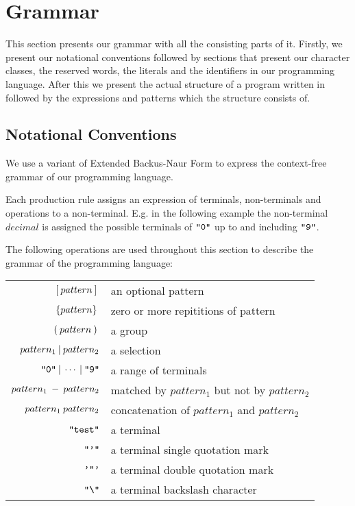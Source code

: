 \section{Grammar}
\label{sec:grammar}

This section presents our grammar with all the consisting parts of it. Firstly, we present our notational conventions followed by sections that present our character classes, the reserved words, the literals and the identifiers in our programming language. After this we present the actual structure of a program written in \productname{} followed by the expressions and patterns which the structure consists of.


\subsection{Notational Conventions}
We use a variant of Extended Backus-Naur Form to express the context-free grammar of
our programming language.

Each production rule assigns an expression of terminals, non-terminals and operations
to a non-terminal. E.g. in the following example the non-terminal $decimal$ is assigned
the possible terminals of $\texttt{"0"}$ up to and including $\texttt{"9"}$.

\begin{ebnf}
\end{ebnf}

The following operations are used throughout this section to describe the grammar of the programming language:

\begin{center}
\begin{tabular}{r l}
  $[\: pattern \:] \:$ & an optional pattern \\
  $\{pattern\} \:$ & zero or more repititions of pattern \\
  $(\: pattern \:) \:$ & a group \\
  $pattern_1 \: | \: pattern_2$ & a selection \\
  $\texttt{"0"} \: | \: \cdots \: | \: \texttt{"9"}$ & a range of terminals \\
  $pattern_1 \: - \: pattern_2$ & matched by $pattern_1$ but not by $pattern_2$\\
  $pattern_1 \: pattern_2$ & concatenation of $pattern_1$ and $pattern_2$ \\
  $\texttt{"test"}$ & a terminal \\
  $\texttt{"'"}$ & a terminal single quotation mark \\
  $\texttt{'"'}$ & a terminal double quotation mark \\
  $\texttt{"\textbackslash"}$ & a terminal backslash character \\
\end{tabular}
\end{center}

